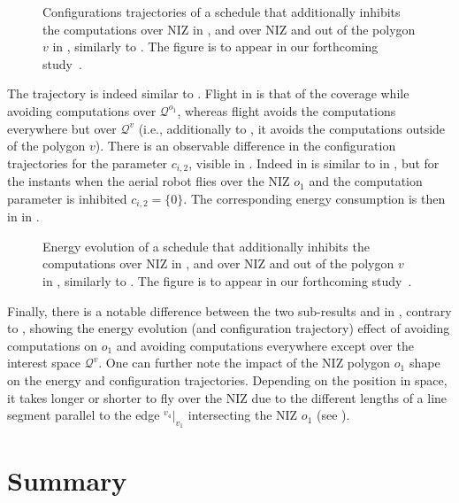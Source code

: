 \begin{figure}[h!]
  \centering
  \selectfont
  \footnotesize    
  
  \caption[The configuration effect of inhibiting computations over NIZ and out of the polygon]{Configurations trajectories of a schedule that additionally inhibits the computations over NIZ in , and over NIZ and out of the polygon $v$ in , similarly to . The figure is to appear in our forthcoming study~\citep{seewald202Xenergy}.}
  \label{fig:ctls-niz}
\end{figure}
The trajectory is indeed similar to . Flight  in  is that of the coverage while avoiding computations over $\mathcal{Q}^{o_1}$, whereas flight  avoids the computations everywhere but over $\mathcal{Q}^v$ (i.e., additionally to , it avoids the computations outside of the polygon $v$). There is an observable difference in the configuration trajectories for the parameter $c_{i,2}$, visible in . Indeed  in  is similar to  in , but for the instants when the aerial robot flies over the NIZ $o_1$ and the computation parameter is inhibited $c_{i,2}=\{0\}$. The corresponding energy consumption is then in  in .

\begin{figure}[h!]
  \centering
  \selectfont
  \footnotesize    
  
  \caption[The energy effect of inhibiting computations over NIZ and out of the polygon]{Energy evolution of a schedule that additionally inhibits the computations over NIZ in , and over NIZ and out of the polygon $v$ in , similarly to . The figure is to appear in our forthcoming study~\citep{seewald202Xenergy}.}
  \label{fig:ener-niz}
\end{figure}
Finally, there is a notable difference between the two sub-results  and  in , contrary to , showing the energy evolution (and configuration trajectory) effect of avoiding computations on $o_1$ and avoiding computations everywhere except over the interest space $\mathcal{Q}^v$. One can further note the impact of the NIZ polygon $o_1$ shape on the energy and configuration trajectories. Depending on the position in space, it takes longer or shorter to fly over the NIZ due to the different lengths of a line segment parallel to the edge ${}^{v_4}|_{v_1}$ intersecting the NIZ $o_1$ (see ).


\section{\color{red}Summary}

